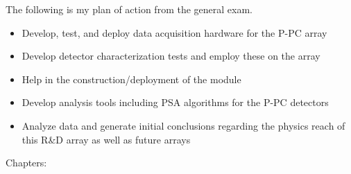 \documentclass{article}
\begin{document}
  The following is my plan of action from the general exam.

  \begin{itemize}
    \item Develop, test, and deploy data acquisition hardware for the P-PC array 
    \item Develop detector characterization tests and employ these on the array 
    \item Help in the construction/deployment of the module 
    \item Develop analysis tools including PSA algorithms for the P-PC detectors 
    \item Analyze data and generate initial conclusions regarding the physics reach of this R\&D array as well as future arrays
    
  \end{itemize}

  Chapters:
\end{document}
